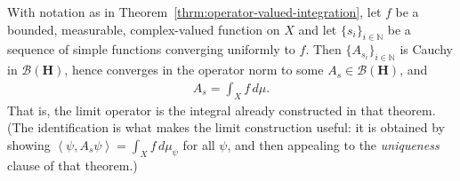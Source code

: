 \begin{proposition}
    \label{prpstn:integral-as-limit-of-simple}
    \leanok
    With notation as in Theorem~\ref{thrm:operator-valued-integration}, let $f$ be a bounded, measurable, complex-valued function on $X$ and let $\{s_i\}_{i \in \mathbb{N}}$ be a sequence of simple functions converging uniformly to $f$. Then $\{A_{s_i}\}_{i \in \mathbb{N}}$ is Cauchy in $\mathcal{B}(\mathbf{H})$, hence converges in the operator norm to some $A_s \in \mathcal{B}(\mathbf{H})$, and
    \begin{align}
        A_s = \int_X f \, d\mu.
    \end{align}
    That is, the limit operator is the integral already constructed in that theorem. (The identification is what makes the limit construction useful: it is obtained by showing $\left< \psi, A_s\psi \right> = \int_X f \, d\mu_\psi$ for all $\psi$, and then appealing to the \textit{uniqueness} clause of that theorem.)
\end{proposition}
